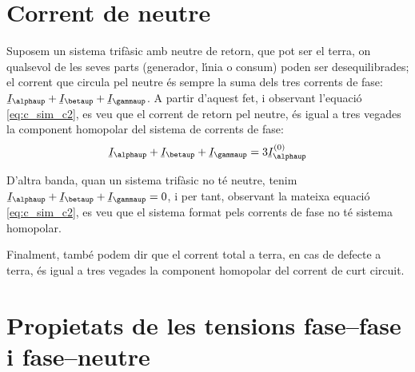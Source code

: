 \section{Corrent de neutre} 

Suposem un sistema trif\`{a}sic amb neutre de retorn, que pot ser el
terra, on qualsevol de les seves parts (generador, l\'{\i}nia o consum)
poden ser desequilibrades; el corrent que circula pel neutre \'{e}s
sempre la suma dels tres corrents de fase: $\cmplx{I}_\alphaup+
\cmplx{I}_\betaup+\cmplx{I}_\gammaup$. A partir d'aquest fet, i
observant l'equaci\'{o} \eqref{eq:c_sim_c2}, es veu que el corrent de
retorn pel neutre, \'{e}s igual a tres vegades la component homopolar
del sistema de corrents de fase:
\begin{equation}
    \cmplx{I}_\alphaup+\cmplx{I}_\betaup+\cmplx{I}_\gammaup =3 \cmplx{I}_\alphaup\ap{(0)}
\end{equation}

D'altra banda, quan un sistema trif\`{a}sic no t\'{e} neutre, tenim
$\cmplx{I}_\alphaup+ \cmplx{I}_\betaup+\cmplx{I}_\gammaup=0$, i per tant,
observant la mateixa equaci\'{o} \eqref{eq:c_sim_c2}, es veu que el
sistema format pels corrents de fase no t\'{e} sistema homopolar.

Finalment, tamb\'{e} podem dir que el corrent total a terra, en cas de
defecte a terra, \'{e}s igual a tres vegades la component homopolar del
corrent de curt circuit.

\section{Propietats de les tensions fase--fase i fase--neutre}\label{sec:comp-sim-neutre}
 

